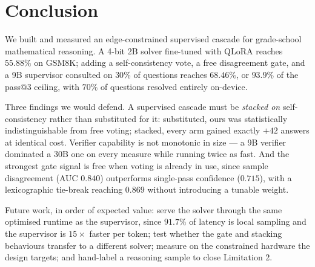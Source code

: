 \documentclass[conference]{IEEEtran}
\begin{document}
\section{Conclusion}

We built and measured an edge-constrained supervised cascade for grade-school mathematical
reasoning. A 4-bit 2B solver fine-tuned with QLoRA reaches $55.88\%$ on GSM8K; adding a
self-consistency vote, a free disagreement gate, and a 9B supervisor consulted on $30\%$ of
questions reaches $68.46\%$, or $93.9\%$ of the pass@3 ceiling, with $70\%$ of questions
resolved entirely on-device.

Three findings we would defend. A supervised cascade must be \emph{stacked on}
self-consistency rather than substituted for it: substituted, ours was statistically
indistinguishable from free voting; stacked, every arm gained exactly $+42$ answers at
identical cost. Verifier capability is not monotonic in size --- a 9B verifier dominated a
30B one on every measure while running twice as fast. And the strongest gate signal is free
when voting is already in use, since sample disagreement (AUC $0.840$) outperforms
single-pass confidence ($0.715$), with a lexicographic tie-break reaching $0.869$ without
introducing a tunable weight.

Future work, in order of expected value: serve the solver through the same optimised runtime
as the supervisor, since $91.7\%$ of latency is local sampling and the supervisor is
$15\times$ faster per token; test whether the gate and stacking behaviours transfer to a
different solver; measure on the constrained hardware the design targets; and hand-label a
reasoning sample to close Limitation 2.



\end{document}

